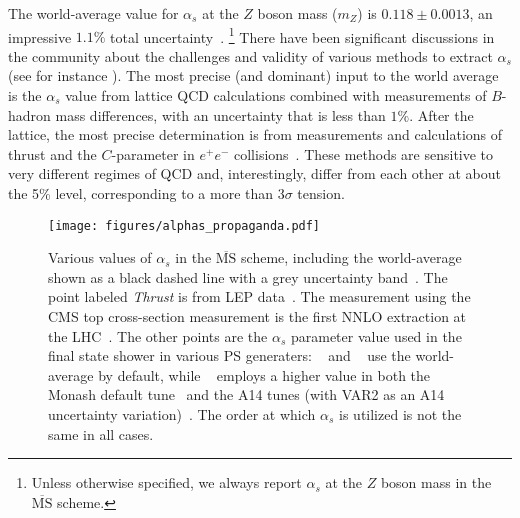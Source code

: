 The world-average value for $\alpha_s$ at the $Z$ boson mass ($m_Z$) is $0.118\pm 0.0013$, an impressive $1.1\%$ total uncertainty~\cite{Olive:2016xmw}.%
\footnote{Unless otherwise specified, we always report $\alpha_s$ at the $Z$ boson mass in the $\overline{\text{MS}}$ scheme.} 
%
There have been significant discussions in the community about the challenges and validity of various methods to extract $\alpha_s$ (see for instance ).
%
The most precise (and dominant) input to the world average is the $\alpha_s$ value from lattice QCD calculations combined with measurements of $B$-hadron mass differences, with an uncertainty that is less than $1\%$. 
%
After the lattice, the most precise determination is from measurements and calculations of thrust and the $C$-parameter in $e^+e^-$ collisions~\cite{Abbate:2010xh,Hoang:2015hka,Heister:2003aj,Abdallah:2004xe,Abreu:1996mk,Abreu:1999rc,Biebel:1999zt,Adeva:1992gv,Abbiendi:2004qz,Abe:1994mf}.
%
These methods are sensitive to very different regimes of QCD and, interestingly, differ from each other at about the 5\% level, corresponding to a more than $3\sigma$ tension.  



\begin{figure}[t]
\begin{center}
\texttt{[image: figures/alphas\_propaganda.pdf]}
\end{center}
\caption{Various values of $\alpha_s$ in the $\overline{\text{MS}}$ scheme, including the world-average shown as a black dashed line with a grey uncertainty band~\cite{Olive:2016xmw}.
%
The point labeled \textit{Thrust} is from LEP data~\cite{Abbate:2010xh,Hoang:2015hka,Heister:2003aj,Abdallah:2004xe,Abreu:1996mk,Abreu:1999rc,Biebel:1999zt,Adeva:1992gv,Abbiendi:2004qz,Abe:1994mf}.
%
The measurement using the CMS top cross-section measurement is the first NNLO extraction at the LHC~\cite{Chatrchyan:2013haa}.
%
The other points are the $\alpha_s$ parameter value used in the final state shower in various PS generaters: \herwig~\cite{Bellm:2015jjp} and \sherpa~\cite{Gleisberg:2008ta} use the world-average by default, while \pythia~\cite{Sjostrand:2006za,Sjostrand:2014zea} employs a higher value in both the Monash default tune~\cite{Skands:2014pea} and the A14 tunes (with VAR2 as an A14 uncertainty variation)~\cite{ATL-PHYS-PUB-2014-021}.
%
The order at which $\alpha_s$ is utilized is not the same in all cases.}
\label{fig:propaganda}
\end{figure}


